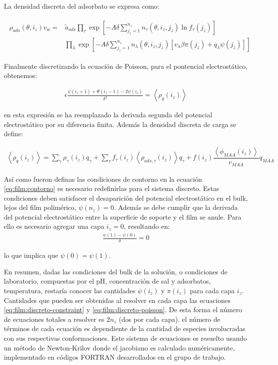 La densidad discreta del adsorbato  se expresa como:


\begin{align}
	\begin{aligned}
		\rho_{ads}(\theta, i_z)v_w = &\tilde{a}_{ads} \prod_\tau\exp\left[-A \delta \sum^{n_z}_{j_z = 1} n_\tau(\theta,i_z,j_z) \ln f_\tau(j_z)\right] \\
		& \prod_\lambda \exp \left[-A \delta \sum^{n_z}_{j_z = 1}  n_\lambda(\theta,i_z, j_z)[v_\lambda\beta\pi(j_z) + q_\lambda \psi(j_z)] \right]
	\end{aligned}
\end{align}

Finalmente discretizando la ecuaci\'on de Poisson, para el pontencial electrost\'atico, obtenemos:

\begin{align}
	\epsilon \frac{\psi(i_z +1) + \Psi(i_z -1) -2\psi(i_z)}{\delta^2} = \left< \rho_q(i_z)\right>
	\label{eq:film:discreto-poisson}
\end{align}

\noindent en esta expresi\'on se ha reemplazado la derivada segunda del potencial electrost\'atico por su diferencia finita. Adem\'as la densidad discreta de carga se define:


\begin{align}
	\left<\rho_q(i_z)\right> = \sum_{\gamma } {\rho_\gamma(i_z) q_\gamma + \sum_\tau{f_\tau(i_z) \left<\rho_{ads,\tau}(i_z)\right> q_\tau} +  f(i_z)\dfrac{\left<\phi_{MAA}(i_z)\right>}{v_{MAA}}q_{MAA}}
	\label{eq:film:rho_charge-discreto}
\end{align}


As\'i como fueron definas las condiciones de contorno en la ecuaci\'on \ref{eq:film:contorno} es necesario redefinirlas para el sistema discreto. Estas condiciones deben satisfacer el desaparici\'on del potencial electrost\'atico en el bulk, lejos del film polim\'erico,  $\psi(n_z) =0 $. Adem\'as se debe cumplir que la derivada del potencial electrost\'atico entre la superficie de soporte y el film se anule.
Para ello es necesario agregar una capa $i_z = 0$, resultando en:
\begin{align}
	\frac{\psi(1) - \psi(0)}{\delta} = 0
\end{align}

\noindent lo que implica que $\psi(0) =  \psi(1)$.

En resumen, dadas las condiciones del bulk de la soluci\'on, o condiciones de laboratorio, compuestas por el pH, concentraci\'on de sal y adsorbatos, temperatura, restar\'ia conocer las cantidades $\psi(i_z)$ y $\pi(i_z)$ para cada capa $i_z$. Cantidades que pueden ser obtenidas al resolver en cada capa las ecuaciones \ref{eq:film:discreto-constraint} y \ref{eq:film:discreto-poisson}.
De esta forma el n\'umero de ecuaciones totales a resolver es $2n_z$ (dos por cada capa). el n\'umero de t\'erminos de cada ecuaci\'on es dependiente de la cantidad de especies involucradas con sus respectivas conformaciones. 
Este sistema de ecuaciones es resuelto usando un m\'etodo de Newton-Krilov donde el jacobiano es calculado num\'ericamente, implementado en c\'odigos FORTRAN desarrollados en el grupo de trabajo.



